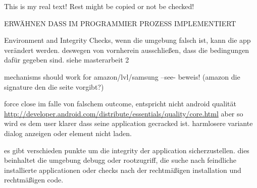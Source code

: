 This is my real text! Rest might be copied or not be checked!

ERWÄHNEN DASS IM PROGRAMMIER PROZESS  IMPLEMENTIERT\newline

Environment and Integrity Checks, wenn die umgebung falsch ist, kann die app verändert werden. deswegen von vornherein ausschließen, dass die bedingungen dafür gegeben sind.\newline
siehe masterarbeit 2\newline

mechanisms should work for amazon/lvl/samsung --see- beweis! (amazon die signature den die seite vorgibt?)\newline

force close im falle von falschem outcome, entspricht nicht android qualität
\url{http://developer.android.com/distribute/essentials/quality/core.html} aber so wird es dem user klarer dass seine application gecracked ist. harmlosere variante dialog anzeigen oder element nicht laden.

es gibt verschieden punkte um die integrity der application sicherzustellen. dies beinhaltet die umgebung debugg oder rootzugriff, die suche nach feindliche installierte applicationen oder checks nach der rechtmäßigen installation und rechtmäßigen code.\newline
